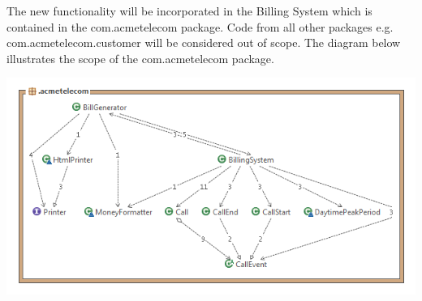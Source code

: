 The new functionality will be incorporated in the Billing System which is contained in the com.acmetelecom package. Code from all other packages e.g. com.acmetelecom.customer will be considered out of scope. The diagram below illustrates the scope of the com.acmetelecom package. 

\begin{center}
	\includegraphics[scale=0.55]{images/Acme_Telecom_Structure.png}
\end{center}

